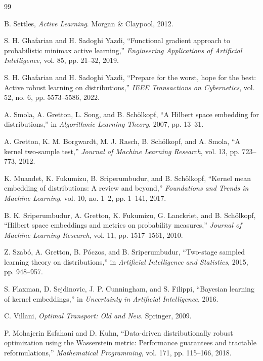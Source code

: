 \documentclass[10pt,journal]{IEEEtran}
\begin{document}

\begin{thebibliography}{99}

B. Settles, \emph{Active Learning}. Morgan \& Claypool, 2012.

S. H. Ghafarian and H. Sadoghi Yazdi, ``Functional gradient approach to probabilistic minimax active learning,'' \emph{Engineering Applications of Artificial Intelligence}, vol. 85, pp. 21--32, 2019.

S. H. Ghafarian and H. Sadoghi Yazdi, ``Prepare for the worst, hope for the best: Active robust learning on distributions,'' \emph{IEEE Transactions on Cybernetics}, vol. 52, no. 6, pp. 5573--5586, 2022.

A. Smola, A. Gretton, L. Song, and B. Sch{\"o}lkopf, ``A Hilbert space embedding for distributions,'' in \emph{Algorithmic Learning Theory}, 2007, pp. 13--31.

A. Gretton, K. M. Borgwardt, M. J. Rasch, B. Sch{\"o}lkopf, and A. Smola, ``A kernel two-sample test,'' \emph{Journal of Machine Learning Research}, vol. 13, pp. 723--773, 2012.

K. Muandet, K. Fukumizu, B. Sriperumbudur, and B. Sch{\"o}lkopf, ``Kernel mean embedding of distributions: A review and beyond,'' \emph{Foundations and Trends in Machine Learning}, vol. 10, no. 1--2, pp. 1--141, 2017.

B. K. Sriperumbudur, A. Gretton, K. Fukumizu, G. Lanckriet, and B. Sch{\"o}lkopf, ``Hilbert space embeddings and metrics on probability measures,'' \emph{Journal of Machine Learning Research}, vol. 11, pp. 1517--1561, 2010.

Z. Szab{\'o}, A. Gretton, B. P{\'o}czos, and B. Sriperumbudur, ``Two-stage sampled learning theory on distributions,'' in \emph{Artificial Intelligence and Statistics}, 2015, pp. 948--957.

S. Flaxman, D. Sejdinovic, J. P. Cunningham, and S. Filippi, ``Bayesian learning of kernel embeddings,'' in \emph{Uncertainty in Artificial Intelligence}, 2016.

C. Villani, \emph{Optimal Transport: Old and New}. Springer, 2009.

P. Mohajerin Esfahani and D. Kuhn, ``Data-driven distributionally robust optimization using the Wasserstein metric: Performance guarantees and tractable reformulations,'' \emph{Mathematical Programming}, vol. 171, pp. 115--166, 2018.


\end{thebibliography}
\end{document}

